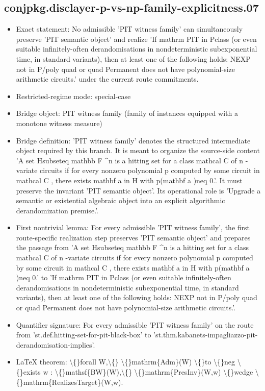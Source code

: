 \documentclass[11pt]{article}
\begin{document}
\subsection*{conjpkg.disclayer-p-vs-np-family-explicitness.07}
\begin{itemize}
\item Exact statement: No admissible 'PIT witness family' can simultaneously preserve 'PIT semantic object' and realize 'If mathrm PIT in Pclass (or even suitable infinitely-often derandomisations in nondeterministic subexponential time, in standard variants), then at least one of the following holds: NEXP not in P/poly quad or quad Permanent does not have polynomial-size arithmetic circuits.' under the current route commitments.
\item Restricted-regime mode: special-case
\item Bridge object: PIT witness family (family of instances equipped with a monotone witness measure)
\item Bridge definition: 'PIT witness family' denotes the structured intermediate object required by this branch. It is meant to organize the source-side content 'A set Hsubseteq mathbb F \textasciicircum{}n is a hitting set for a class mathcal C of n -variate circuits if for every nonzero polynomial p computed by some circuit in mathcal C , there exists mathbf a in H with p(mathbf a )neq 0.'. It must preserve the invariant 'PIT semantic object'. Its operational role is 'Upgrade a semantic or existential algebraic object into an explicit algorithmic derandomization premise.'.
\item First nontrivial lemma: For every admissible 'PIT witness family', the first route-specific realization step preserves 'PIT semantic object' and prepares the passage from 'A set Hsubseteq mathbb F \textasciicircum{}n is a hitting set for a class mathcal C of n -variate circuits if for every nonzero polynomial p computed by some circuit in mathcal C , there exists mathbf a in H with p(mathbf a )neq 0.' to 'If mathrm PIT in Pclass (or even suitable infinitely-often derandomisations in nondeterministic subexponential time, in standard variants), then at least one of the following holds: NEXP not in P/poly quad or quad Permanent does not have polynomial-size arithmetic circuits.'.
\item Quantifier signature: For every admissible 'PIT witness family' on the route from 'st.def.hitting-set-for-pit-black-box' to 'st.thm.kabanets-impagliazzo-pit-derandomisation-implies'.
\item LaTeX theorem: \textbackslash\{\}forall W,\textbackslash\{\} \textbackslash\{\}mathrm\{Adm\}(W) \textbackslash\{\}to \textbackslash\{\}neg \textbackslash\{\}exists w : \textbackslash\{\}mathsf\{BW\}(W),\textbackslash\{\} \textbackslash\{\}mathrm\{PresInv\}(W,w) \textbackslash\{\}wedge \textbackslash\{\}mathrm\{RealizesTarget\}(W,w).

\end{itemize}
\end{document}
